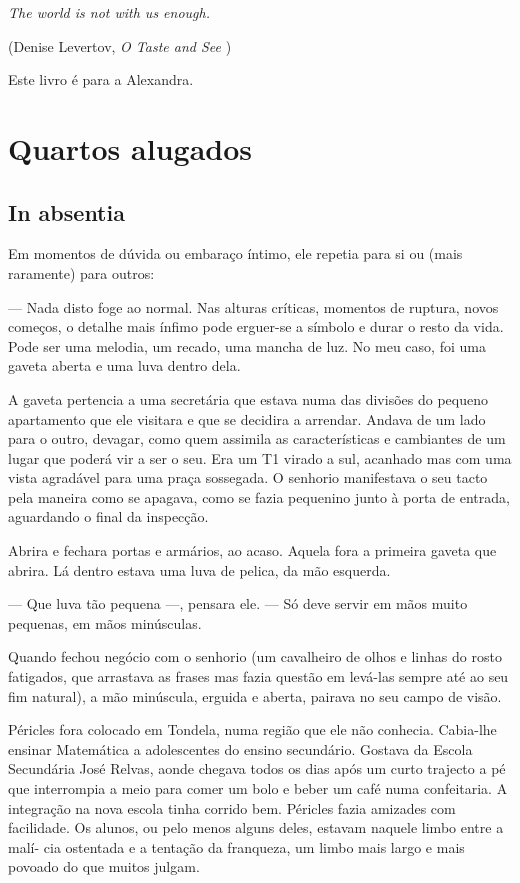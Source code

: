 \emph{The world is not with us enough.}

(Denise Levertov, \emph{O Taste and See })

Este livro é para a Alexandra.


\part{Quartos alugados}

\chapter{In absentia}

Em momentos de dúvida ou embaraço íntimo, ele repetia para si ou (mais
raramente) para outros:

  --- Nada disto foge ao normal. Nas alturas críticas, momentos de
  ruptura, novos começos, o detalhe mais ínfimo pode erguer-se a símbolo
  e durar o resto da vida. Pode ser uma melodia, um recado, uma mancha
  de luz. No meu caso, foi uma gaveta aberta e uma luva dentro dela.


A gaveta pertencia a uma secretária que estava numa das divisões do
pequeno apartamento que ele visitara e que se decidira a arrendar.
Andava de um lado para o outro, devagar, como quem assimila as
características e cambiantes de um lugar que poderá vir a ser o seu. Era
um T1 virado a sul, acanhado mas com uma vista agradável para uma praça
sossegada. O senhorio manifestava o seu tacto pela maneira como se
apagava, como se fazia pequenino junto à porta de entrada, aguardando o
final da inspecção.

Abrira e fechara portas e armários, ao acaso. Aquela fora a primeira
gaveta que abrira. Lá dentro estava uma luva de pelica, da mão esquerda.

--- Que luva tão pequena ---, pensara ele. --- Só deve servir em mãos muito pequenas, em mãos minúsculas.

Quando fechou negócio com o senhorio (um cavalheiro de olhos e linhas do
rosto fatigados, que arrastava as frases mas fazia questão em levá-las
sempre até ao seu fim natural), a mão minúscula, erguida e aberta,
pairava no seu campo de visão.

Péricles fora colocado em Tondela, numa região que ele não conhecia.
Cabia-lhe ensinar Matemática a adolescentes do ensino secundário.
Gostava da Escola Secundária José Relvas, aonde chegava todos os dias
após um curto trajecto a pé que interrompia a meio para comer um bolo e
beber um café numa confeitaria. A integração na nova escola tinha
corrido bem. Péricles fazia amizades com facilidade. Os alunos, ou pelo
menos alguns deles, estavam naquele limbo entre a malí- cia ostentada e
a tentação da franqueza, um limbo mais largo e mais povoado do que
muitos julgam.

